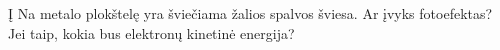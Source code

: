 \question Į Na metalo plokštelę yra šviečiama žalios spalvos šviesa. Ar įvyks fotoefektas? Jei taip, kokia bus elektronų kinetinė energija?
